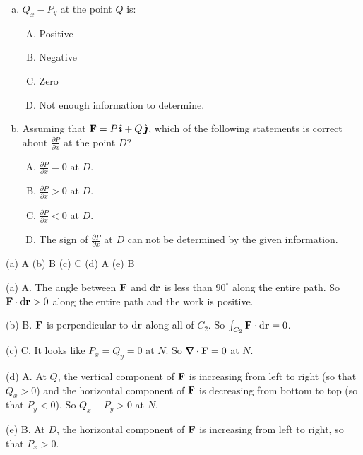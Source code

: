 \begin{question}[M317 2012J]
\begin{enumerate}[(a)]
\item 
$Q_x - P_y$ at the point $Q$ is:
\begin{enumerate}[(A)]
\item Positive
\item Negative
\item Zero
\item Not enough information to determine.
\end{enumerate}


\item 
Assuming that $\mathbf{F} = P\,\hat{\pmb{\imath}} + Q\,\hat{\pmb{\jmath}}$, which of the following 
statements is correct about $\frac{\partial P}{\partial x}$ 
at the point $D$?
\begin{enumerate}[(A)]
\item $\frac{\partial P}{\partial x}=0$  at $D$.
\item $\frac{\partial P}{\partial x}>0$  at $D$.
\item $\frac{\partial P}{\partial x}<0$  at $D$.
\item The sign of $\frac{\partial P}{\partial x}$ 
at $D$ can not be determined by the given information.
\end{enumerate}

\end{enumerate}



\end{question}

%

\begin{answer}
(a) A\qquad
(b) B\qquad
(c) C\qquad
(d) A\qquad
(e) B 
\end{answer}

\begin{solution} 
(a)
A. The angle between $\mathbf{F}$ and $\mathrm{d}\mathbf{r}$ is less than $90^\circ$
along the entire path. So $\mathbf{F}\cdot\mathrm{d}\mathbf{r}>0$ along the entire path and
the work is positive.

(b) 
B. $\mathbf{F}$ is perpendicular to $\mathrm{d}\mathbf{r}$ along all of $C_2$.
So $\int_{C_2} \mathbf{F}\cdot\mathrm{d}\mathbf{r}=0$.

(c)
C. It looks like $P_x=Q_y=0$ at $N$. So $\vnabla\cdot\vF=0$ at $N$.

(d) 
A. At $Q$, the vertical component of $\mathbf{F}$ is increasing from left to right
(so that $Q_x>0$) and the horizontal component of $\mathbf{F}$  is decreasing
from bottom to top (so that $P_y<0$). So $Q_x - P_y>0$ at $N$.

(e) 
B. At $D$,  the horizontal component of $\mathbf{F}$  is increasing
from left to right, so that $P_x>0$.
\end{solution}

